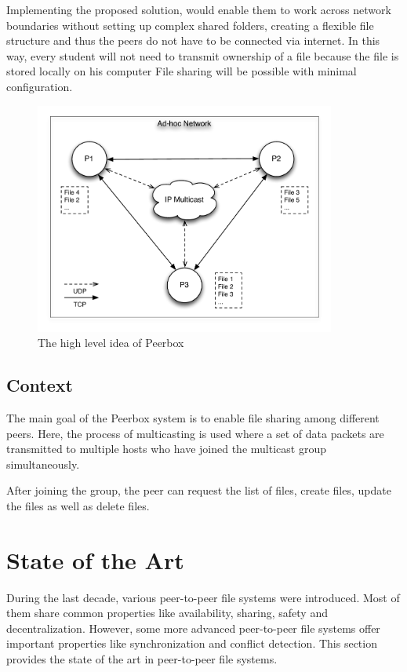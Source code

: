 Implementing the proposed solution, would  enable them to work across network boundaries without setting up complex shared folders, creating a flexible file structure and thus the peers do not have to be connected via internet. In this way, every student will not need to transmit ownership of a file because the file is stored locally on his computer File sharing will be possible with minimal configuration. 

 
\begin{figure}[H]
\begin{center}
\includegraphics[height=3in]{figures/idea.pdf}
\caption{The high level idea of Peerbox}
\label{fig:idea}
\end{center}
\end{figure}



\subsection{Context}
The main goal of the Peerbox system is to enable file sharing among different peers. Here, the process of multicasting is used where a set of data packets are transmitted to  multiple hosts who have joined the multicast group simultaneously. 

After joining the group, the peer can request the list of files, create files, update the files as well as delete files.



\section{State of the Art}

During the last decade, various peer-to-peer file systems were introduced. Most of them share common properties like availability, sharing, safety and decentralization. However, some more advanced peer-to-peer file systems offer important properties like synchronization and conflict detection. This section provides the state of the art in peer-to-peer file systems.

